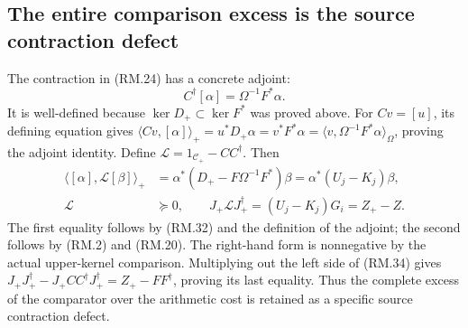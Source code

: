 \subsection{The entire comparison excess is the source contraction defect}
The contraction in (RM.24) has a concrete adjoint:
\begin{equation}
 C^\dagger[\alpha]=\Omega^{-1}F^*\alpha.\tag{RM.32}
\end{equation}
It is well-defined because $\ker D_+\subset\ker F^*$ was proved above.
For $Cv=[u]$, its defining equation gives
$\langle Cv,[\alpha]\rangle_+=u^*D_+\alpha=v^*F^*\alpha
=\langle v,\Omega^{-1}F^*\alpha\rangle_\Omega$, proving the adjoint
identity. Define $\mathcal L=1_{\mathcal C_+}-CC^\dagger$. Then
\begin{align}
 \langle[\alpha],\mathcal L[\beta]\rangle_+
 &=\alpha^*(D_+-F\Omega^{-1}F^*)\beta
 =\alpha^*(U_j-K_j)\beta,\tag{RM.33}\\
 \mathcal L&\succeq0,\qquad
 J_+\mathcal L J_+^\dagger=(U_j-K_j)G_i=Z_+-Z.\tag{RM.34}
\end{align}
The first equality follows by (RM.32) and the definition of the adjoint;
the second follows by (RM.2) and (RM.20). The right-hand form is
nonnegative by the actual upper-kernel comparison. Multiplying out the
left side of (RM.34) gives $J_+J_+^\dagger-J_+CC^\dagger J_+^\dagger
=Z_+-FF^\dagger$, proving its last equality. Thus the complete excess
of the comparator over the arithmetic cost is retained as a specific
source contraction defect.

